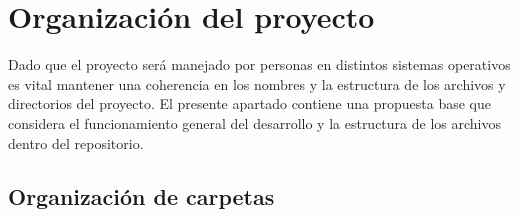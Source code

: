 \section{Organización del proyecto}\label{organizacion:organizacion-del-proyecto}

Dado que el proyecto será manejado por personas en distintos sistemas operativos es vital mantener una coherencia en los nombres y la estructura de los archivos y directorios del proyecto. El presente apartado contiene una propuesta base que considera el funcionamiento general del desarrollo y la estructura de los archivos dentro del repositorio.

\subsection{Organización de carpetas}\label{organizacion:arreglo-carpetas}

